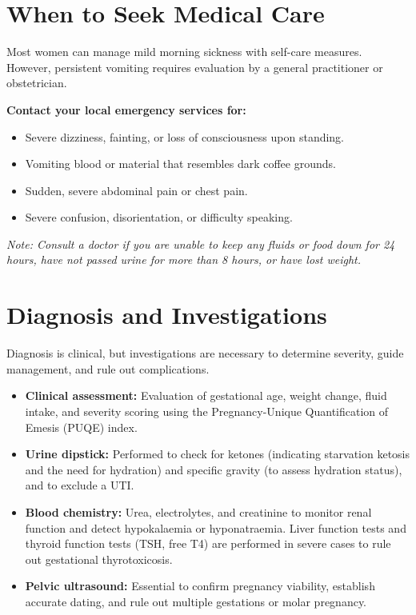 \section*{When to Seek Medical Care}
Most women can manage mild morning sickness with self-care measures. However, persistent vomiting requires evaluation by a general practitioner or obstetrician.

\textbf{Contact your local emergency services for:}
\begin{itemize}
    \item Severe dizziness, fainting, or loss of consciousness upon standing.
    \item Vomiting blood or material that resembles dark coffee grounds.
    \item Sudden, severe abdominal pain or chest pain.
    \item Severe confusion, disorientation, or difficulty speaking.
\end{itemize}
\textit{Note: Consult a doctor if you are unable to keep any fluids or food down for 24 hours, have not passed urine for more than 8 hours, or have lost weight.}

\section*{Diagnosis and Investigations}
Diagnosis is clinical, but investigations are necessary to determine severity, guide management, and rule out complications.
\begin{itemize}
    \item \textbf{Clinical assessment:} Evaluation of gestational age, weight change, fluid intake, and severity scoring using the Pregnancy-Unique Quantification of Emesis (PUQE) index.
    \item \textbf{Urine dipstick:} Performed to check for ketones (indicating starvation ketosis and the need for hydration) and specific gravity (to assess hydration status), and to exclude a UTI.
    \item \textbf{Blood chemistry:} Urea, electrolytes, and creatinine to monitor renal function and detect hypokalaemia or hyponatraemia. Liver function tests and thyroid function tests (TSH, free T4) are performed in severe cases to rule out gestational thyrotoxicosis.
    \item \textbf{Pelvic ultrasound:} Essential to confirm pregnancy viability, establish accurate dating, and rule out multiple gestations or molar pregnancy.
\end{itemize}

